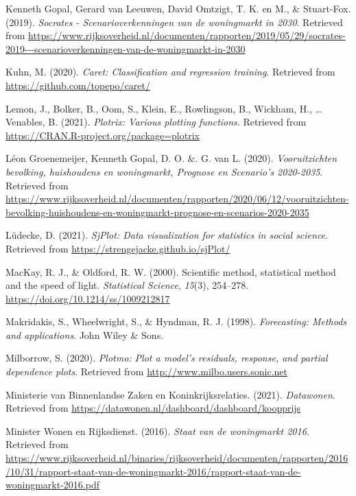 \documentclass[
]{article}
\begin{document}
\leavevmode\hypertarget{ref-KennethGopalGerardvanLeeuwenDavidOmtzigt2019}{}%
Kenneth Gopal, Gerard van Leeuwen, David Omtzigt, T. K. en M., \&
Stuart-Fox. (2019). \emph{Socrates - Scenarioverkenningen van de
woningmarkt in 2030}. Retrieved from
\url{https://www.rijksoverheid.nl/documenten/rapporten/2019/05/29/socrates-2019---scenarioverkenningen-van-de-woningmarkt-in-2030}

\leavevmode\hypertarget{ref-R-caret}{}%
Kuhn, M. (2020). \emph{Caret: Classification and regression training}.
Retrieved from \url{https://github.com/topepo/caret/}

\leavevmode\hypertarget{ref-R-plotrix}{}%
Lemon, J., Bolker, B., Oom, S., Klein, E., Rowlingson, B., Wickham, H.,
\ldots{} Venables, B. (2021). \emph{Plotrix: Various plotting
functions}. Retrieved from
\url{https://CRAN.R-project.org/package=plotrix}

\leavevmode\hypertarget{ref-LeonGroenemeijerKennethGopal2020}{}%
Léon Groenemeijer, Kenneth Gopal, D. O. \&. G. van L. (2020).
\emph{Vooruitzichten bevolking, huishoudens en woningmarkt, Prognose en
Scenario's 2020-2035}. Retrieved from
\url{https://www.rijksoverheid.nl/documenten/rapporten/2020/06/12/vooruitzichten-bevolking-huishoudens-en-woningmarkt-prognose-en-scenarios-2020-2035}

\leavevmode\hypertarget{ref-R-sjPlot}{}%
Lüdecke, D. (2021). \emph{SjPlot: Data visualization for statistics in
social science}. Retrieved from
\url{https://strengejacke.github.io/sjPlot/}

\leavevmode\hypertarget{ref-OldfordR.J.MacKay2000}{}%
MacKay, R. J., \& Oldford, R. W. (2000). Scientific method, statistical
method and the speed of light. \emph{Statistical Science}, \emph{15}(3),
254--278. \url{https://doi.org/10.1214/ss/1009212817}

\leavevmode\hypertarget{ref-fma1998}{}%
Makridakis, S., Wheelwright, S., \& Hyndman, R. J. (1998).
\emph{Forecasting: Methods and applications}. John Wiley \& Sons.

\leavevmode\hypertarget{ref-R-plotmo}{}%
Milborrow, S. (2020). \emph{Plotmo: Plot a model's residuals, response,
and partial dependence plots}. Retrieved from
\url{http://www.milbo.users.sonic.net}

\leavevmode\hypertarget{ref-MinisterievanBinnenlandseZakenenKoninkrijksrelaties2021}{}%
Ministerie van Binnenlandse Zaken en Koninkrijksrelaties. (2021).
\emph{Datawonen}. Retrieved from
\url{https://datawonen.nl/dashboard/dashboard/koopprijs}

\leavevmode\hypertarget{ref-CBS2020b}{}%
Minister Wonen en Rijksdienst. (2016). \emph{Staat van de woningmarkt
2016}. Retrieved from
\url{https://www.rijksoverheid.nl/binaries/rijksoverheid/documenten/rapporten/2016/10/31/rapport-staat-van-de-woningmarkt-2016/rapport-staat-van-de-woningmarkt-2016.pdf}
\end{document}
